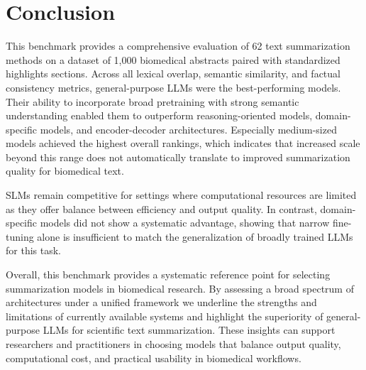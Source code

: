 \section{Conclusion}

This benchmark provides a comprehensive evaluation of 62 text summarization methods on a dataset of 1,000 biomedical abstracts paired with standardized highlights sections. Across all lexical overlap, semantic similarity, and factual consistency metrics, general-purpose \acp{LLM} were the best-performing models. Their ability to incorporate broad pretraining with strong semantic understanding enabled them to outperform reasoning-oriented models, domain-specific models, and encoder-decoder architectures. Especially medium-sized models achieved the highest overall rankings, which indicates that increased scale beyond this range does not automatically translate to improved summarization quality for biomedical text.

\acp{SLM} remain competitive for settings where computational resources are limited as they offer balance between efficiency and output quality. In contrast, domain-specific models did not show a systematic advantage, showing that narrow fine-tuning alone is insufficient to match the generalization of broadly trained \acp{LLM} for this task.

Overall, this benchmark provides a systematic reference point for selecting summarization models in biomedical research. By assessing a broad spectrum of architectures under a unified framework we underline the strengths and limitations of currently available systems and highlight the superiority of general-purpose \acp{LLM} for scientific text summarization. These insights can support researchers and practitioners in choosing models that balance output quality, computational cost, and practical usability in biomedical workflows.
